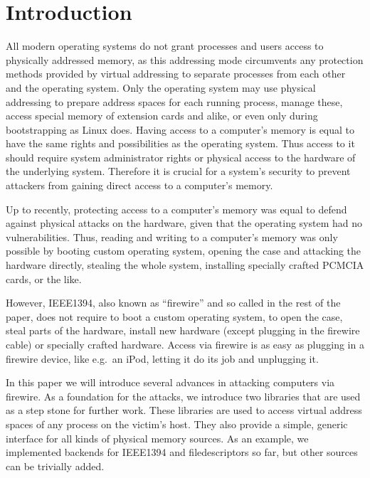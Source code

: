 %
%

\section{Introduction}

All modern operating systems do not grant processes and users access to
physically addressed memory, as this addressing mode circumvents any protection
methods provided by virtual addressing to separate processes from each other and
the operating system. Only the operating system may use physical addressing to
prepare address spaces for each running process, manage these, access special
memory of extension cards and alike, or even only during bootstrapping as Linux
does. Having access to a computer's memory is equal to have the same rights and
possibilities as the operating system. Thus access to it should require system
administrator rights or physical access to the hardware of the underlying
system.  Therefore it is crucial for a system's security to prevent attackers
from gaining direct access to a computer's memory.

Up to recently, protecting access to a computer's memory was equal to defend
against physical attacks on the hardware, given that the operating system had no
vulnerabilities.  Thus, reading and writing to a computer's memory was only
possible by booting custom operating system, opening the case and attacking the
hardware directly, stealing the whole system, installing specially crafted
PCMCIA cards, or the like.  

However, IEEE1394, also known as ``firewire'' and so called in the rest of the
paper, does not require to boot a custom operating system, to open the case,
steal parts of the hardware, install new hardware (except plugging in the
firewire cable) or specially crafted hardware.  Access via firewire is as easy
as plugging in a firewire device, like e.g.~an iPod, letting it do its job and
unplugging it.

In this paper we will introduce several advances in attacking computers via
firewire.  As a foundation for the attacks, we introduce two libraries that are
used as a step stone for further work. These libraries are used to access
virtual address spaces of any process on the victim's host. They also provide a
simple, generic interface for all kinds of physical memory sources. As an
example, we implemented backends for IEEE1394 and filedescriptors so far, but
other sources can be trivially added.

